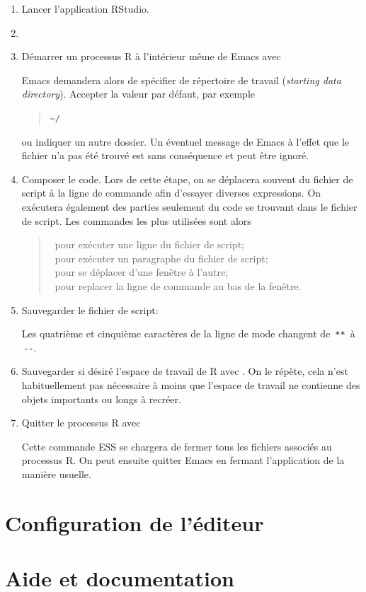 \begin{enumerate}
\item Lancer l'application RStudio.
\item
\item Démarrer un processus R à l'intérieur même de Emacs avec
  \begin{quote}
    \returnkey
  \end{quote}
  Emacs demandera alors de spécifier de répertoire de travail
  (\emph{starting data directory}). Accepter la valeur par défaut, par
  exemple
  \begin{quote}
    \verb=~/ =\returnkey
  \end{quote}
  ou indiquer un autre dossier. Un éventuel message de Emacs à l'effet
  que le fichier  n'a pas été trouvé est sans
  conséquence et peut être ignoré.
\item Composer le code. Lors de cette étape, on se déplacera souvent
  du fichier de script à la ligne de commande afin d'essayer diverses
  expressions. On exécutera également des parties seulement du code se
  trouvant dans le fichier de script. Les commandes les plus utilisées
  sont alors
  \begin{quote}
    \ pour exécuter une ligne du fichier de script; \\
    \ pour exécuter un paragraphe du fichier de script; \\
    \ pour se déplacer d'une fenêtre à l'autre; \\
    \ pour replacer la ligne de commande au bas de la
    fenêtre.
  \end{quote}
\item Sauvegarder le fichier de script:
  \begin{quote}
  \end{quote}
  Les quatrième et cinquième caractères de la ligne de mode changent
  de \,\verb|**|\, à \,\verb|--|.
\item Sauvegarder si désiré l'espace de travail de R avec
  . On le répète, cela
  n'est habituellement pas nécessaire à moins que l'espace de travail
  ne contienne des objets importants ou longs à recréer.
\item Quitter le processus R avec
  \begin{quote}
  \end{quote}
  Cette commande ESS se chargera de fermer tous les fichiers associés
  au processus R. On peut ensuite quitter Emacs en fermant
  l'application de la manière usuelle.
\end{enumerate}



\section{Configuration de l'éditeur}
\label{rstudio:configuration}



\section{Aide et documentation}
\label{rstudio:aide}


